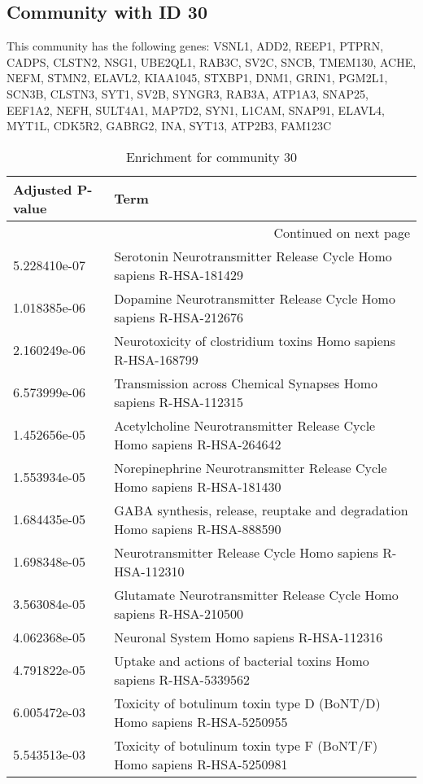 \subsection*{Community with ID 30}
This community has the following genes: VSNL1, ADD2, REEP1, PTPRN, CADPS, CLSTN2, NSG1, UBE2QL1, RAB3C, SV2C, SNCB, TMEM130, ACHE, NEFM, STMN2, ELAVL2, KIAA1045, STXBP1, DNM1, GRIN1, PGM2L1, SCN3B, CLSTN3, SYT1, SV2B, SYNGR3, RAB3A, ATP1A3, SNAP25, EEF1A2, NEFH, SULT4A1, MAP7D2, SYN1, L1CAM, SNAP91, ELAVL4, MYT1L, CDK5R2, GABRG2, INA, SYT13, ATP2B3, FAM123C
\\
\begin{longtable}{p{2.4cm}p{14.5cm}}
\caption{Enrichment for community 30}\\
\toprule
Adjusted \newline P-value &                                                                         Term \\
\midrule
\endhead
\midrule
\multicolumn{2}{r}{{Continued on next page}} \\
\midrule
\endfoot

\bottomrule
\endlastfoot
             5.228410e-07 &           Serotonin Neurotransmitter Release Cycle Homo sapiens R-HSA-181429 \\
             1.018385e-06 &            Dopamine Neurotransmitter Release Cycle Homo sapiens R-HSA-212676 \\
             2.160249e-06 &                Neurotoxicity of clostridium toxins Homo sapiens R-HSA-168799 \\
             6.573999e-06 &              Transmission across Chemical Synapses Homo sapiens R-HSA-112315 \\
             1.452656e-05 &       Acetylcholine Neurotransmitter Release Cycle Homo sapiens R-HSA-264642 \\
             1.553934e-05 &      Norepinephrine Neurotransmitter Release Cycle Homo sapiens R-HSA-181430 \\
             1.684435e-05 &  GABA synthesis, release, reuptake and degradation Homo sapiens R-HSA-888590 \\
             1.698348e-05 &                     Neurotransmitter Release Cycle Homo sapiens R-HSA-112310 \\
             3.563084e-05 &           Glutamate Neurotransmitter Release Cycle Homo sapiens R-HSA-210500 \\
             4.062368e-05 &                                    Neuronal System Homo sapiens R-HSA-112316 \\
             4.791822e-05 &            Uptake and actions of bacterial toxins Homo sapiens R-HSA-5339562 \\
             6.005472e-03 &       Toxicity of botulinum toxin type D (BoNT/D) Homo sapiens R-HSA-5250955 \\
             5.543513e-03 &       Toxicity of botulinum toxin type F (BoNT/F) Homo sapiens R-HSA-5250981 \\
\end{longtable}


